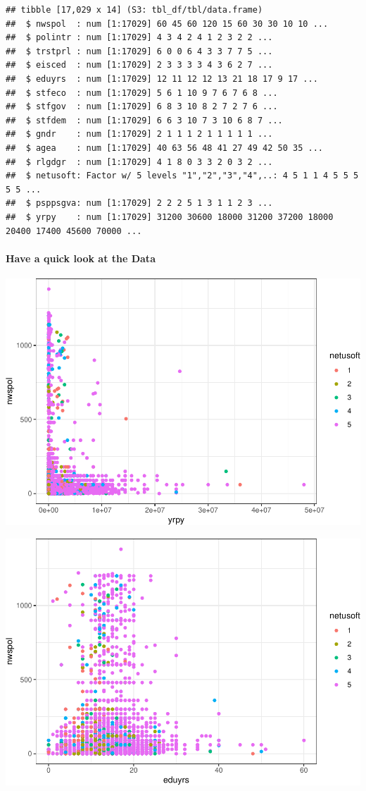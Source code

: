 \documentclass[
]{article}
\begin{document}
\begin{verbatim}
## tibble [17,029 x 14] (S3: tbl_df/tbl/data.frame)
##  $ nwspol  : num [1:17029] 60 45 60 120 15 60 30 30 10 10 ...
##  $ polintr : num [1:17029] 4 3 4 2 4 1 2 3 2 2 ...
##  $ trstprl : num [1:17029] 6 0 0 6 4 3 3 7 7 5 ...
##  $ eisced  : num [1:17029] 2 3 3 3 3 4 3 6 2 7 ...
##  $ eduyrs  : num [1:17029] 12 11 12 12 13 21 18 17 9 17 ...
##  $ stfeco  : num [1:17029] 5 6 1 10 9 7 6 7 6 8 ...
##  $ stfgov  : num [1:17029] 6 8 3 10 8 2 7 2 7 6 ...
##  $ stfdem  : num [1:17029] 6 6 3 10 7 3 10 6 8 7 ...
##  $ gndr    : num [1:17029] 2 1 1 1 2 1 1 1 1 1 ...
##  $ agea    : num [1:17029] 40 63 56 48 41 27 49 42 50 35 ...
##  $ rlgdgr  : num [1:17029] 4 1 8 0 3 3 2 0 3 2 ...
##  $ netusoft: Factor w/ 5 levels "1","2","3","4",..: 4 5 1 1 4 5 5 5 5 5 ...
##  $ psppsgva: num [1:17029] 2 2 2 5 1 3 1 1 2 3 ...
##  $ yrpy    : num [1:17029] 31200 30600 18000 31200 37200 18000 20400 17400 45600 70000 ...
\end{verbatim}

\hypertarget{have-a-quick-look-at-the-data}{%
\paragraph{Have a quick look at the
Data}\label{have-a-quick-look-at-the-data}}

\includegraphics{ESS_DE_files/figure-latex/unnamed-chunk-12-1.pdf}

\includegraphics{ESS_DE_files/figure-latex/unnamed-chunk-13-1.pdf}
\end{document}
